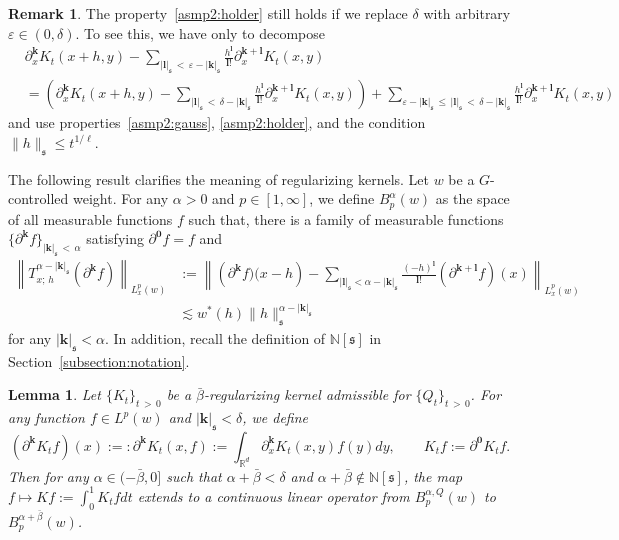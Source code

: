 \documentclass[10pt]{amsart}
\newtheorem{lemm}[theo]{Lemma}
\theoremstyle{definition}
\newtheorem{rema}[theo]{Remark}
\numberwithin{equation}{section}
\newcommand{\bbR}{\mathbb{R}}
\newcommand{\bbN}{\mathbb{N}}
\newcommand{\mfs}{\mathfrak{s}}
\newcommand{\bfzo}{\mathbf{0}}
\newcommand{\bfk}{\mathbf{k}}
\newcommand{\bfl}{\mathbf{l}}
\begin{document}
\begin{rema}\label{asmp2'}
The property~\eqref{asmp2:holder} still holds if we replace $\delta$ with arbitrary $\varepsilon\in(0,\delta)$. To see this, we have only to decompose
\begin{align*}
&\partial_x^{\bfk}K_t(x+h,y)-\sum_{|{\bfl}|_\mfs\,<\,\varepsilon-|{\bfk}|_\mfs}\frac{h^{\bfl}}{{\bfl}!}\partial_x^{{\bfk}+{\bfl}}K_t(x,y)\\
&=\left(\partial_x^{\bfk}K_t(x+h,y)-\sum_{|{\bfl}|_\mfs\,<\,\delta-|{\bfk}|_\mfs}\frac{h^{\bfl}}{{\bfl}!}\partial_x^{{\bfk}+{\bfl}}K_t(x,y)\right)+\sum_{\varepsilon-|{\bfk}|_{\mfs}\,\le\,|{\bfl}|_{\mfs}\,<\,\delta-|{\bfk}|_{\mfs}}\frac{h^{\bfl}}{{\bfl}!}\partial_x^{{\bfk}+{\bfl}}K_t(x,y)
\end{align*}
and use properties~\eqref{asmp2:gauss}, \eqref{asmp2:holder}, and the condition $\|h\|_{\mfs}\le t^{1/\ell}$.
\end{rema}
\setcounter{equation}{1}
The following result clarifies the meaning of regularizing kernels. Let $w$ be a $G$-controlled weight. For any $\alpha>0$ and $p\in[1,\infty]$, we define $B_p^{\alpha}(w)$ as the space of all measurable functions $f$ such that, there is a family of measurable functions $\{\partial^{\bfk}f\}_{|{\bfk}|_\mfs\,<\,\alpha}$ satisfying $\partial^{\bfzo}f=f$ and
\begin{align*}
\left\|T_{x;\,h}^{\alpha-|{\bfk}|_\mfs}\left(\partial^{\bfk}f\right)\right\|_{L_x^p(w)} &:=\left\|\left(\partial^{\bfk}f)(x-h\right)-\sum_{|{\bfl}|_\mfs<\alpha-|{\bfk}|_\mfs}\frac{(-h)^{\bfl}}{{\bfl}!}\left(\partial^{{\bfk}+{\bfl}}f\right)(x)\right\|_{L_x^p(w)}\\
&\lesssim w^*(h)\|h\|_\mfs^{\alpha-|{\bfk}|_\mfs}
\end{align*}
for any $|{\bfk}|_\mfs<\alpha$. In addition, recall the definition of $\bbN[\mfs]$ in Section~\ref{subsection:notation}.

\begin{lemm}\label{lem:whyregularize}
Let $\{K_t\}_{t\,>\,0}$ be a $\bar\beta$-regularizing kernel admissible for $\{Q_t\}_{t\,>\,0}$. For any function $f\in L^p(w)$ and $|{\bfk}|_{\mfs}<\delta$, we define
\[
\left(\partial^{\bfk}K_tf\right)(x):=:\partial^{\bfk}K_t(x,f):=\int_{\bbR^d}\partial_x^{\bfk}K_t(x,y)f(y)dy,\qquad K_tf:=\partial^{\bfzo}K_tf.
\]
Then for any $\alpha\in(-\bar\beta,0]$ such that $\alpha+\bar\beta<\delta$ and $\alpha+\bar\beta\notin\bbN[\mfs]$, the map $f\mapsto Kf:=\int_0^1K_tfdt$ extends to a continuous linear operator from $B_p^{\alpha,Q}(w)$ to $B_p^{\alpha+\bar\beta}(w)$.
\end{lemm}
\end{document}
